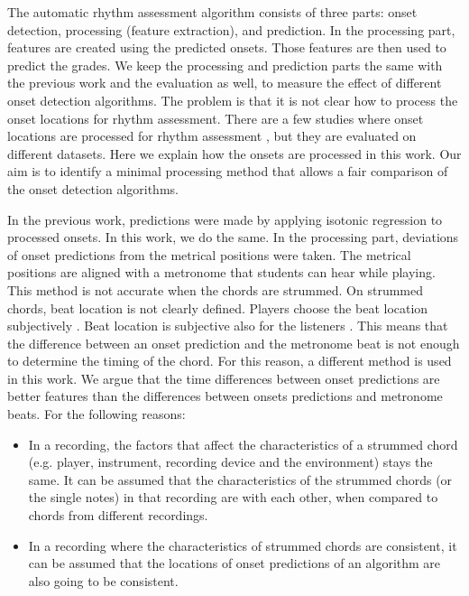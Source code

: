 The automatic rhythm assessment algorithm consists of three parts: onset detection, processing (feature extraction), and prediction. In the processing part, features are created using the predicted onsets. Those features are then used to predict the grades. We keep the processing and prediction parts the same with the previous work  \cite{eremenko2020performance} and the evaluation as well, to measure the effect of different onset detection algorithms. The problem is that it is not clear how to process the onset locations for rhythm assessment. There are a few studies where onset locations are processed for rhythm assessment \cite{percival2008thesis} \cite{abesser2014automatic} \cite{wu2016towards} \cite{falcaoMast}, but they are evaluated on different datasets. Here we explain how the onsets are processed in this work. Our aim is to identify a minimal processing method that allows a fair comparison of the onset detection algorithms.

In the previous work, predictions were made by applying isotonic regression \cite{mair2009isotone} to processed onsets. In this work, we do the same. In the processing part, deviations of onset predictions from the metrical positions were taken. The metrical positions are aligned with a metronome that students can hear while playing. This method is not accurate when the chords are strummed. On strummed chords, beat location is not clearly defined. Players choose the beat location subjectively \cite{freire2018strumming}. Beat location is subjective also for the listeners \cite{hove2007sensorimotor}. This means that the difference between an onset prediction and the metronome beat is not enough to determine the timing of the chord. For this reason, a different method is used in this work. We argue that the time differences between onset predictions are better features than the differences between onsets predictions and metronome beats. For the following reasons: 

\begin{itemize}
  \item In a recording, the factors that affect the characteristics of a strummed chord (e.g. player, instrument, recording device and the environment) stays the same. It can be assumed that the characteristics of the strummed chords (or the single notes) in that recording are with each other, when compared to chords from different recordings.
  
  \item In a recording where the characteristics of strummed chords are consistent, it can be assumed that the locations of onset predictions of an algorithm are also going to be consistent.  
\end{itemize}

